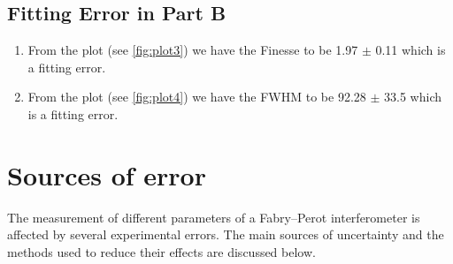 \subsection{Fitting Error in Part B}
\begin{enumerate}
    \item From the plot (see \cref{fig:plot3}) we have the Finesse to be 1.97 $\pm$ 0.11 which is a fitting error.
    \item From the plot (see \cref{fig:plot4}) we have the FWHM to be 92.28 $\pm$ 33.5 which is a fitting error.
\end{enumerate}

\section{Sources of error}
The measurement of different parameters of a Fabry--Perot interferometer is affected by several experimental errors. The main sources of uncertainty and the methods used to reduce their effects are discussed below.

